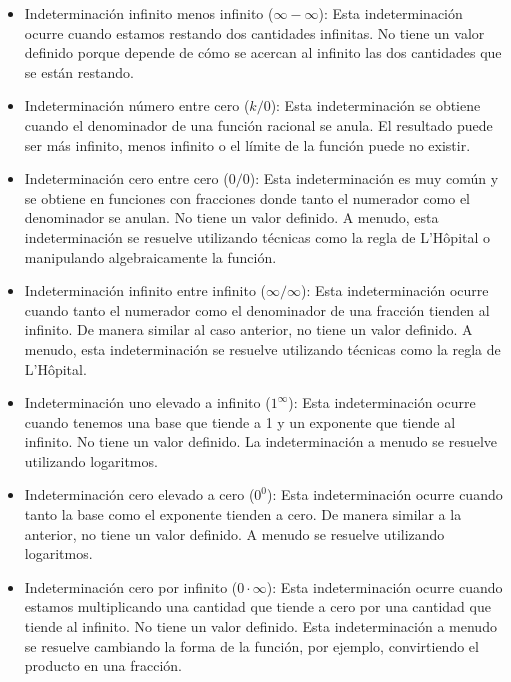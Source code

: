 \documentclass[a4paper,12pt]{article}
\begin{document}
\begin{itemize}

\item Indeterminación infinito menos infinito ($\infty - \infty$): Esta indeterminación ocurre cuando estamos restando dos cantidades infinitas. No tiene un valor definido porque depende de cómo se acercan al infinito las dos cantidades que se están restando.

\item Indeterminación número entre cero ($k/0$): Esta indeterminación se obtiene cuando el denominador de una función racional se anula. El resultado puede ser más infinito, menos infinito o el límite de la función puede no existir.

\item Indeterminación cero entre cero ($0/0$): Esta indeterminación es muy común y se obtiene en funciones con fracciones donde tanto el numerador como el denominador se anulan. No tiene un valor definido. A menudo, esta indeterminación se resuelve utilizando técnicas como la regla de L’Hôpital o manipulando algebraicamente la función.

\item Indeterminación infinito entre infinito ($\infty/\infty$): Esta indeterminación ocurre cuando tanto el numerador como el denominador de una fracción tienden al infinito. De manera similar al caso anterior, no tiene un valor definido. A menudo, esta indeterminación se resuelve utilizando técnicas como la regla de L’Hôpital.

\item Indeterminación uno elevado a infinito ($1^\infty$): Esta indeterminación ocurre cuando tenemos una base que tiende a 1 y un exponente que tiende al infinito. No tiene un valor definido. La indeterminación a menudo se resuelve utilizando logaritmos.

\item Indeterminación cero elevado a cero ($0^0$): Esta indeterminación ocurre cuando tanto la base como el exponente tienden a cero. De manera similar a la anterior, no tiene un valor definido. A menudo se resuelve utilizando logaritmos.

\item Indeterminación cero por infinito ($0 \cdot \infty$): Esta indeterminación ocurre cuando estamos multiplicando una cantidad que tiende a cero por una cantidad que tiende al infinito. No tiene un valor definido. Esta indeterminación a menudo se resuelve cambiando la forma de la función, por ejemplo, convirtiendo el producto en una fracción.


\end{itemize}
\end{document}
